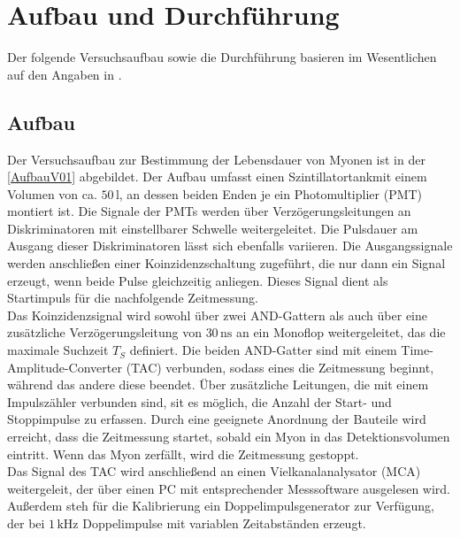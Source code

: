 \section{Aufbau und Durchführung}
Der folgende Versuchsaufbau sowie die Durchführung basieren im Wesentlichen auf den Angaben in \cite{anleitungV01}.
\subsection{Aufbau}
\label{Aufbau}
Der Versuchsaufbau zur Bestimmung der Lebensdauer von Myonen ist in der \autoref{AufbauV01} abgebildet.
Der Aufbau umfasst einen Szintillatortankmit einem Volumen von ca. $50\,\unit{\litre}$, an dessen beiden Enden je ein Photomultiplier (PMT) montiert ist. Die Signale der PMTs werden über
Verzögerungsleitungen an Diskriminatoren mit einstellbarer Schwelle weitergeleitet. Die Pulsdauer am Ausgang dieser Diskriminatoren lässt sich ebenfalls
variieren. Die Ausgangssignale werden anschließen einer Koinzidenzschaltung zugeführt, die nur dann ein Signal erzeugt, wenn beide Pulse gleichzeitig anliegen.
Dieses Signal dient als Startimpuls für die nachfolgende Zeitmessung.\\
Das Koinzidenzsignal wird sowohl über zwei AND-Gattern als auch über eine zusätzliche Verzögerungsleitung von $30\,\unit{\nano\second}$ an ein Monoflop
weitergeleitet, das die maximale Suchzeit $T_S$ definiert. Die beiden AND-Gatter sind mit einem Time-Amplitude-Converter (TAC) verbunden, sodass eines die 
Zeitmessung beginnt, während das andere diese beendet. Über zusätzliche Leitungen, die mit einem Impulszähler verbunden sind, sit es möglich, die Anzahl der
Start- und Stoppimpulse zu erfassen. Durch eine geeignete Anordnung der Bauteile wird erreicht, dass die Zeitmessung startet, sobald ein Myon in das Detektionsvolumen
eintritt. Wenn das Myon zerfällt, wird die Zeitmessung gestoppt.\\
Das Signal des TAC wird anschließend an einen Vielkanalanalysator (MCA) weitergeleit, der über einen PC mit entsprechender Messsoftware ausgelesen wird. Außerdem steh 
für die Kalibrierung ein Doppelimpulsgenerator zur Verfügung, der bei $1\,\unit{\kilo\hertz}$ Doppelimpulse mit variablen Zeitabständen erzeugt.
